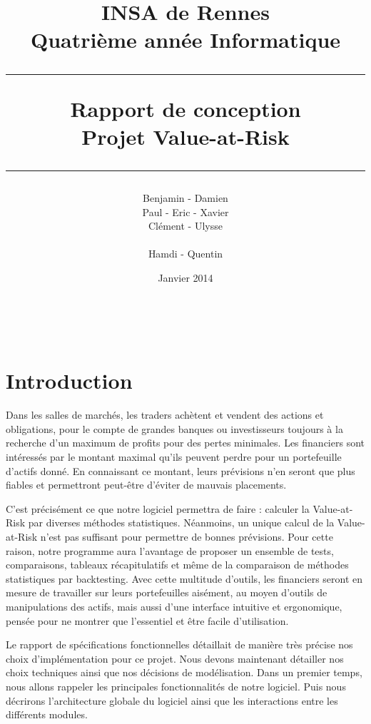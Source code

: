 \documentclass[a4paper,titlepage,french]{report}
\title{INSA de Rennes \\ Quatrième année Informatique \\ \bigskip \hrule \bigskip Rapport de conception \\ \bigskip Projet Value-at-Risk \bigskip \hrule}
\author{Benjamin \bsc{Bouguet} - Damien \bsc{Carduner} \\Paul \bsc{Chaignon} - Eric \bsc{Chauty} - Xavier \bsc{Fraboulet} \\ Clément \bsc{Gautrais} - Ulysse \bsc{Goarant} \\ ~~\\
Hamdi \bsc{Raissi} - Quentin \bsc{Giai Gianetto}}
\date{Janvier 2014}
\begin{document}
\maketitle

\thispagestyle{empty}
\newpage

~~
\thispagestyle{empty}
\newpage

\tableofcontents
\newpage

\listoffigures
\newpage




\chapter*{Introduction}

Dans les salles de marchés, les traders achètent et vendent des actions et obligations, pour le compte de grandes banques ou investisseurs toujours à la recherche d’un maximum de profits pour des pertes minimales.
Les financiers sont intéressés par le montant maximal qu'ils peuvent perdre pour un portefeuille d'actifs donné.
En connaissant ce montant, leurs prévisions n’en seront que plus fiables et permettront peut-être d’éviter de mauvais placements.

C’est précisément ce que notre logiciel permettra de faire : calculer la Value-at-Risk par diverses méthodes statistiques.
Néanmoins, un unique calcul de la Value-at-Risk n’est pas suffisant pour permettre de bonnes prévisions.
Pour cette raison, notre programme aura l’avantage de proposer un ensemble de tests, comparaisons, tableaux récapitulatifs et même de la comparaison de méthodes statistiques par backtesting.
Avec cette multitude d’outils, les financiers seront en mesure de travailler sur leurs portefeuilles aisément, au moyen d’outils de manipulations des actifs, mais aussi d’une interface intuitive et ergonomique, pensée pour ne montrer que l’essentiel et être facile d’utilisation.

Le rapport de spécifications fonctionnelles détaillait de manière très précise nos choix d’implémentation pour ce projet.
Nous devons maintenant détailler nos choix techniques ainsi que nos décisions de modélisation.
Dans un premier temps, nous allons rappeler les principales fonctionnalités de notre logiciel.
Puis nous décrirons l’architecture globale du logiciel ainsi que les interactions entre les différents modules.
\end{document}

